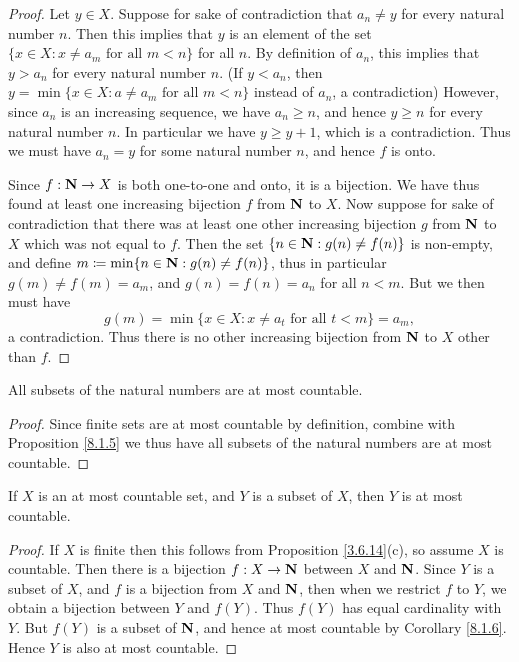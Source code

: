 \begin{proof}
    Let \(y \in X\).
    Suppose for sake of contradiction that \(a_n \neq y\) for every natural number \(n\).
    Then this implies that \(y\) is an element of the set \(\{x \in X : x \neq a_m \text{ for all } m < n\}\) for all \(n\).
    By definition of \(a_n\), this implies that \(y > a_n\) for every natural number \(n\).
    (If \(y < a_n\), then \(y = \min\{x \in X : a \neq a_m \text{ for all } m < n\}\) instead of \(a_n\), a contradiction)
    However, since \(a_n\) is an increasing sequence, we have \(a_n \geq n\), and hence \(y \geq n\) for every natural number \(n\).
    In particular we have \(y \geq y + 1\), which is a contradiction.
    Thus we must have \(a_n = y\) for some natural number \(n\), and hence \(f\) is onto.

    Since \(f : \mathbf{N} \to X\) is both one-to-one and onto, it is a bijection.
    We have thus found at least one increasing bijection \(f\) from \(\mathbf{N}\) to \(X\).
    Now suppose for sake of contradiction that there was at least one other increasing bijection \(g\) from \(\mathbf{N}\) to \(X\) which was not equal to \(f\).
    Then the set \(\{n \in \mathbf{N} : g(n) \neq f(n)\}\) is non-empty, and define \(m \coloneqq \min\{n \in \mathbf{N} : g(n) \neq f(n)\}\), thus in particular \(g(m) \neq f(m) = a_m\), and \(g(n) = f(n) = a_n\) for all \(n < m\).
    But we then must have
    \[
        g(m) = \min\{x \in X : x \neq a_t \text{ for all } t < m\} = a_m,
    \]
    a contradiction.
    Thus there is no other increasing bijection from \(\mathbf{N}\) to \(X\) other than \(f\).
\end{proof}

\begin{corollary}\label{8.1.6}
    All subsets of the natural numbers are at most countable.
\end{corollary}

\begin{proof}
    Since finite sets are at most countable by definition, combine with Proposition \ref{8.1.5} we thus have all subsets of the natural numbers are at most countable.
\end{proof}

\begin{corollary}\label{8.1.7}
    If \(X\) is an at most countable set, and \(Y\) is a subset of \(X\), then \(Y\) is at most countable.
\end{corollary}

\begin{proof}
    If \(X\) is finite then this follows from Proposition \ref{3.6.14}(c), so assume \(X\) is countable.
    Then there is a bijection \(f : X \to \mathbf{N}\) between \(X\) and \(\mathbf{N}\).
    Since \(Y\) is a subset of \(X\), and \(f\) is a bijection from \(X\) and \(\mathbf{N}\), then when we restrict \(f\) to \(Y\), we obtain a bijection between \(Y\) and \(f(Y)\).
    Thus \(f(Y)\) has equal cardinality with \(Y\).
    But \(f(Y)\) is a subset of \(\mathbf{N}\), and hence at most countable by Corollary \ref{8.1.6}.
    Hence \(Y\) is also at most countable.
\end{proof}

